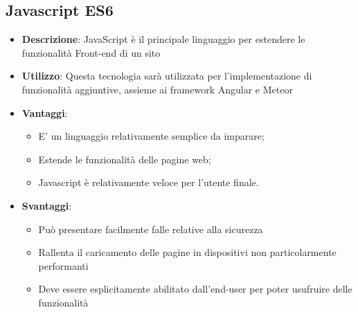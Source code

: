 \subsection{Javascript ES6}
\begin{itemize}
	\item \textbf{Descrizione}: JavaScript è il principale linguaggio per estendere le funzionalità Front-end di un sito
	\item \textbf{Utilizzo}: Questa tecnologia sarà utilizzata per l'implementazione di funzionalità aggiuntive, assieme ai framework Angular e Meteor
	\item \textbf{Vantaggi}:
	\begin{itemize}
		\item E' un linguaggio relativamente semplice da imparare;
		\item Estende le funzionalità delle pagine web;
		\item Javascript è relativamente veloce per l'utente finale.
	\end{itemize}
	\item \textbf{Svantaggi}:
	\begin{itemize}
		\item Può presentare facilmente falle relative alla sicurezza
		\item Rallenta il caricamento delle pagine in dispositivi non particolarmente performanti
		\item Deve essere esplicitamente abilitato dall'end-user per poter usufruire delle funzionalità
	\end{itemize}
\end{itemize}

